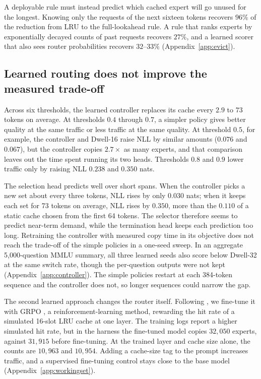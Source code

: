 \documentclass{article}
\begin{document}
A deployable rule must instead predict which cached expert will go unused for
the longest. Knowing only the requests of the next sixteen tokens recovers
$96\%$ of the reduction from LRU to the full-lookahead rule. A rule that ranks
experts by exponentially decayed counts of past requests recovers $27\%$, and a
learned scorer that also sees router probabilities recovers $32$--$33\%$
(Appendix~\ref{app:evict}).

\vspace{-3pt}

\subsection{Learned routing does not improve the measured trade-off}

\label{sec:learned}

\vspace{-2pt}

Across six thresholds, the learned controller replaces its cache every $2.9$
to $73$ tokens on average. At thresholds $0.4$ through $0.7$, a simpler policy
gives better quality at the same traffic or less traffic at the same quality.
At threshold $0.5$, for example, the controller and Dwell-16 raise NLL by
similar amounts ($0.076$ and $0.067$), but the controller copies $2.7\times$ as
many experts, and that comparison leaves out the time spent running its two
heads. Thresholds $0.8$ and $0.9$ lower traffic only by raising NLL $0.238$ and
$0.350$ nats.

The selection head predicts well over short spans. When the controller picks
a new set about every three tokens, NLL rises by only $0.030$ nats; when it
keeps each set for 73 tokens on average, NLL rises by $0.350$, more than the
$0.110$ of a static cache chosen from the first 64 tokens. The selector
therefore seems to predict near-term demand, while the termination head keeps
each prediction too long. Retraining the controller with measured copy time in
its objective does not reach the trade-off of the simple policies in a
one-seed sweep. In an aggregate 5,000-question MMLU summary, all three learned
seeds also score below Dwell-32 at the same switch rate, though the
per-question outputs were not kept (Appendix~\ref{app:controller}). The simple
policies restart at each 384-token sequence and the controller does not, so
longer sequences could narrow the gap.

The second learned approach changes the router itself. Following
\citet{carmoe2026}, we fine-tune it with GRPO \citep{shao2024deepseekmath}, a
reinforcement-learning method, rewarding the hit rate of a simulated 16-slot
LRU cache at one layer. The training logs report a higher simulated hit rate,
but in the harness the fine-tuned model copies $32{,}050$ experts, against
$31{,}915$ before fine-tuning. At the trained layer and cache size alone, the
counts are $10{,}963$ and $10{,}954$. Adding a cache-size tag to the prompt
increases traffic, and a supervised fine-tuning control stays close to the base
model (Appendix~\ref{app:workingset}).
\end{document}
